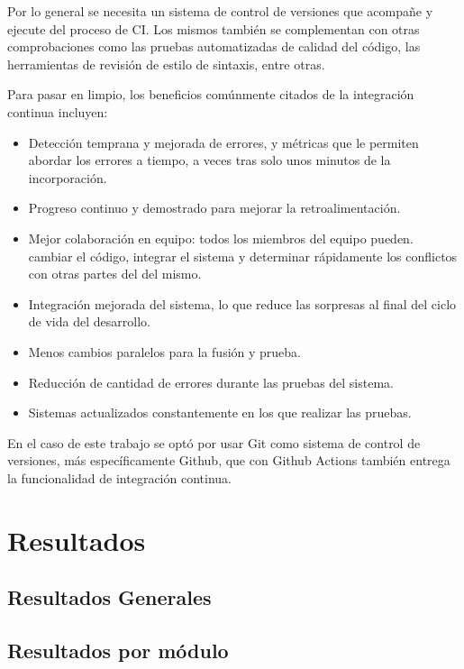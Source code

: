 Por lo general se necesita un sistema de control de versiones que acompañe y
ejecute del proceso de CI\@. Los mismos también se complementan con otras
comprobaciones como las pruebas automatizadas de calidad del código, las
herramientas de revisión de estilo de sintaxis, entre otras.

Para pasar en limpio, los beneficios comúnmente citados de la integración
continua incluyen:
\begin{itemize}
  \item Detección temprana y mejorada de errores, y métricas que le permiten
  abordar los errores a tiempo, a veces tras solo unos minutos de la incorporación.
  \item Progreso continuo y demostrado para mejorar la retroalimentación.
  \item Mejor colaboración en equipo: todos los miembros del equipo pueden.
  cambiar el código, integrar el sistema y determinar rápidamente los conflictos
  con otras partes del del mismo.
  \item Integración mejorada del sistema, lo que reduce las sorpresas al final
  del ciclo de vida del desarrollo.
  \item Menos cambios paralelos para la fusión y prueba.
  \item Reducción de cantidad de errores durante las pruebas del sistema.
  \item Sistemas actualizados constantemente en los que realizar las pruebas.
\end{itemize}

En el caso de este trabajo se optó por usar Git como sistema de control de
versiones, más específicamente Github, que con Github Actions también entrega
la funcionalidad de integración continua.


\section{Resultados}

\subsection{Resultados Generales}

\subsection{Resultados por módulo}
